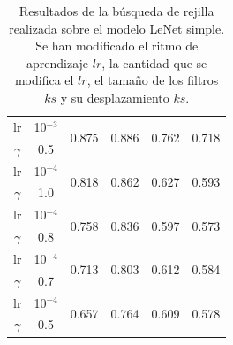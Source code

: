 \documentclass[a4paper,12pt,twoside,titlepage]{article}
\begin{document}
\begin{table}[h!]
\begin{tabular}{|cc||cc|cc|cc|cc|}
  \multicolumn{1}{|c|}{lr}       & 10$^{-3}$ & \multicolumn{2}{c|}{\multirow{2}{*}{0.875}} & \multicolumn{2}{c|}{\multirow{2}{*}{0.886}} & \multicolumn{2}{c|}{\multirow{2}{*}{0.762}} & \multicolumn{2}{c|}{\multirow{2}{*}{0.718}} \\ \cline{1-2}
  \multicolumn{1}{|c|}{$\gamma$} & 0.5       & \multicolumn{2}{c|}{}                       & \multicolumn{2}{c|}{}                       & \multicolumn{2}{c|}{}                       & \multicolumn{2}{c|}{}                       \\ \hline
  \multicolumn{1}{|c|}{lr}       & 10$^{-4}$ & \multicolumn{2}{c|}{\multirow{2}{*}{0.818}} & \multicolumn{2}{c|}{\multirow{2}{*}{0.862}} & \multicolumn{2}{c|}{\multirow{2}{*}{0.627}} & \multicolumn{2}{c|}{\multirow{2}{*}{0.593}} \\ \cline{1-2}
  \multicolumn{1}{|c|}{$\gamma$} & 1.0       & \multicolumn{2}{c|}{}                       & \multicolumn{2}{c|}{}                       & \multicolumn{2}{c|}{}                       & \multicolumn{2}{c|}{}                       \\ \hline
  \multicolumn{1}{|c|}{lr}       & 10$^{-4}$ & \multicolumn{2}{c|}{\multirow{2}{*}{0.758}} & \multicolumn{2}{c|}{\multirow{2}{*}{0.836}} & \multicolumn{2}{c|}{\multirow{2}{*}{0.597}} & \multicolumn{2}{c|}{\multirow{2}{*}{0.573}} \\ \cline{1-2}
  \multicolumn{1}{|c|}{$\gamma$} & 0.8       & \multicolumn{2}{c|}{}                       & \multicolumn{2}{c|}{}                       & \multicolumn{2}{c|}{}                       & \multicolumn{2}{c|}{}                       \\ \hline
  \multicolumn{1}{|c|}{lr}       & 10$^{-4}$ & \multicolumn{2}{c|}{\multirow{2}{*}{0.713}} & \multicolumn{2}{c|}{\multirow{2}{*}{0.803}} & \multicolumn{2}{c|}{\multirow{2}{*}{0.612}} & \multicolumn{2}{c|}{\multirow{2}{*}{0.584}} \\ \cline{1-2}
  \multicolumn{1}{|c|}{$\gamma$} & 0.7       & \multicolumn{2}{c|}{}                       & \multicolumn{2}{c|}{}                       & \multicolumn{2}{c|}{}                       & \multicolumn{2}{c|}{}                       \\ \hline
  \multicolumn{1}{|c|}{lr}       & 10$^{-4}$ & \multicolumn{2}{c|}{\multirow{2}{*}{0.657}} & \multicolumn{2}{c|}{\multirow{2}{*}{0.764}} & \multicolumn{2}{c|}{\multirow{2}{*}{0.609}} & \multicolumn{2}{c|}{\multirow{2}{*}{0.578}} \\ \cline{1-2}
  \multicolumn{1}{|c|}{$\gamma$} & 0.5       & \multicolumn{2}{c|}{}                       & \multicolumn{2}{c|}{}                       & \multicolumn{2}{c|}{}                       & \multicolumn{2}{c|}{}                       \\ \hline
  \end{tabular}
  \caption{Resultados de la búsqueda de rejilla realizada sobre el modelo LeNet simple. Se han modificado el ritmo de aprendizaje $lr$, la cantidad que se modifica el $lr$, el tamaño de los filtros $ks$ y su desplazamiento $ks$.}
  \label{tab:resultados_kernel_simple}
\end{table}
\end{document}
